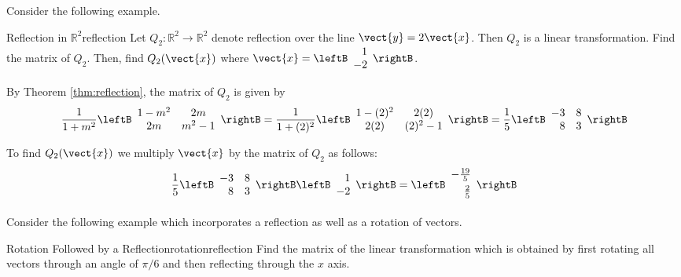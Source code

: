 Consider the following example. 

\begin{example}{Reflection in $\mathbb{R}^2$}{reflection}
Let $Q_2: \mathbb{R}^2 \to \mathbb{R}^2$ denote reflection over the line $\vect{y}=2\vect{x}$. Then $Q_2$ is a linear transformation. Find the matrix of $Q_2$. Then, find $Q_2 (\vect{x})$ where $\vect{x} = \leftB 
\begin{array}{r}
1 \\
-2
\end{array}
\rightB$. 
\end{example}

\begin{solution}
By Theorem \ref{thm:reflection}, the matrix of $Q_2$ is given by 
\[
\frac{1}{1+m^2}
\leftB
\begin{array}{cc}
1-m^2 & 2m \\
2m & m^2-1 
\end{array}
\rightB
=
\frac{1}{1+(2)^2}
\leftB
\begin{array}{cc}
1-(2)^2 & 2(2) \\
2(2) & (2)^2-1 
\end{array}
\rightB
=
\frac{1}{5}
\leftB
\begin{array}{rr}
-3 & 8 \\
8 & 3 
\end{array}
\rightB
\]

To find $Q_2(\vect{x})$ we multiply $\vect{x}$ by the matrix of $Q_2$ as follows:
\[
\frac{1}{5}
\leftB
\begin{array}{rr}
-3 & 8 \\
8 & 3 
\end{array}
\rightB
\leftB
\begin{array}{r}
1 \\
-2
\end{array}
\rightB
=
\leftB
\begin{array}{r}
-\vspace{0.05in}\frac{19}{5} \\
\vspace{0.05in}\frac{2}{5}
\end{array}
\rightB
\]

\end{solution}

Consider the following example which incorporates a reflection as well as a rotation of vectors.

\begin{example}{Rotation Followed by a Reflection}{rotationreflection}
Find the matrix of the linear transformation which is obtained by first
rotating all vectors through an angle of $\pi /6$ and then reflecting
through the $x$ axis.
\end{example}

